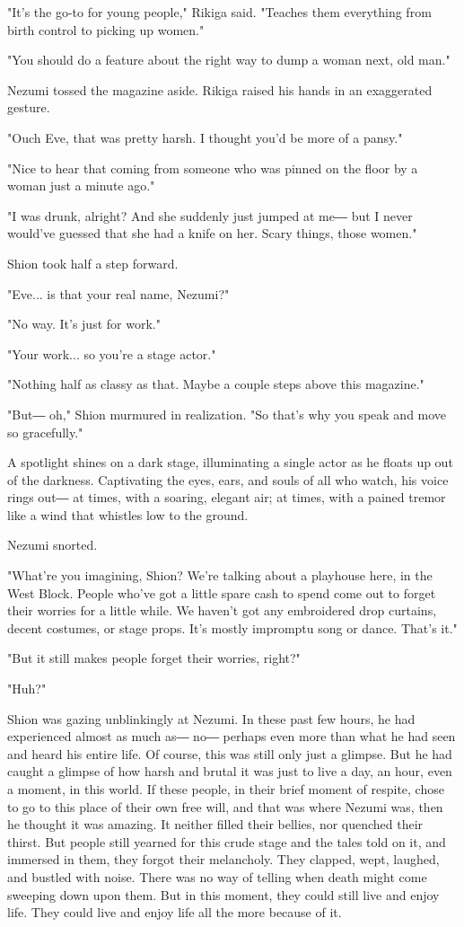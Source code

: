 "It's the go-to for young people," Rikiga said. "Teaches them everything
from birth control to picking up women."

"You should do a feature about the right way to dump a woman next, old
man."

Nezumi tossed the magazine aside. Rikiga raised his hands in an
exaggerated gesture.

"Ouch Eve, that was pretty harsh. I thought you'd be more of a pansy."

"Nice to hear that coming from someone who was pinned on the floor by a
woman just a minute ago."

"I was drunk, alright? And she suddenly just jumped at me― but I never
would've guessed that she had a knife on her. Scary things, those
women."

Shion took half a step forward.

"Eve... is that your real name, Nezumi?"

"No way. It's just for work."

"Your work... so you're a stage actor."

"Nothing half as classy as that. Maybe a couple steps above this
magazine."

"But― oh," Shion murmured in realization. "So that's why you speak and
move so gracefully."

A spotlight shines on a dark stage, illuminating a single actor as he
floats up out of the darkness. Captivating the eyes, ears, and souls of
all who watch, his voice rings out― at times, with a soaring, elegant
air; at times, with a pained tremor like a wind that whistles low to the
ground.

Nezumi snorted.

"What're you imagining, Shion? We're talking about a playhouse here, in
the West Block. People who've got a little spare cash to spend come out
to forget their worries for a little while. We haven't got any
embroidered drop curtains, decent costumes, or stage props. It's mostly
impromptu song or dance. That's it."

"But it still makes people forget their worries, right?"

"Huh?"

Shion was gazing unblinkingly at Nezumi. In these past few hours, he had
experienced almost as much as― no― perhaps even more than what he had
seen and heard his entire life. Of course, this was still only just a
glimpse. But he had caught a glimpse of how harsh and brutal it was just
to live a day, an hour, even a moment, in this world. If these people,
in their brief moment of respite, chose to go to this place of their own
free will, and that was where Nezumi was, then he thought it was
amazing. It neither filled their bellies, nor quenched their thirst. But
people still yearned for this crude stage and the tales told on it, and
immersed in them, they forgot their melancholy. They clapped, wept,
laughed, and bustled with noise. There was no way of telling when death
might come sweeping down upon them. But in this moment, they could still
live and enjoy life. They could live and enjoy life all the more because
of it.

